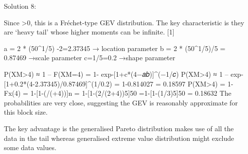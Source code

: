 Solution 8:
\item
Since \gamma>0, this is a Fréchet-type GEV distribution.
The key characteristic is they are ‘heavy tail’ whose higher moments can be infinite.
[1]
\item
a = 2 * (50^{1/5}) -2=2.37345 → location parameter
b = 2 * (50^{1/5})/5 = 0.87469 →scale parameter
c=1/5=0.2 →shape parameter


P(XM>4) ≈ 1 – F(XM=4) = 1- exp{-[1+c*(4−𝑎𝑏)]^(−1/𝑐)}
P(XM>4) ≈ 1 – exp{-[1+0.2*(4-2.37345)/0.87469]^(1/0.2)} = 1-0.814027 = 0.18597
P(XM>4) = 1- Fx(4) = 1-[1-(\lambda/(\lambda+4))\alpha ]n = 1-[1-(2/(2+4))5]50
=1-[1-(1/3)5]50 = 0.18632
The probabilities are very close, suggesting the GEV is reasonably approximate for this block size.


\item
The key advantage is the generalised Pareto distribution makes use of all the data in the tail whereas generalised extreme value distribution might exclude some data values.



